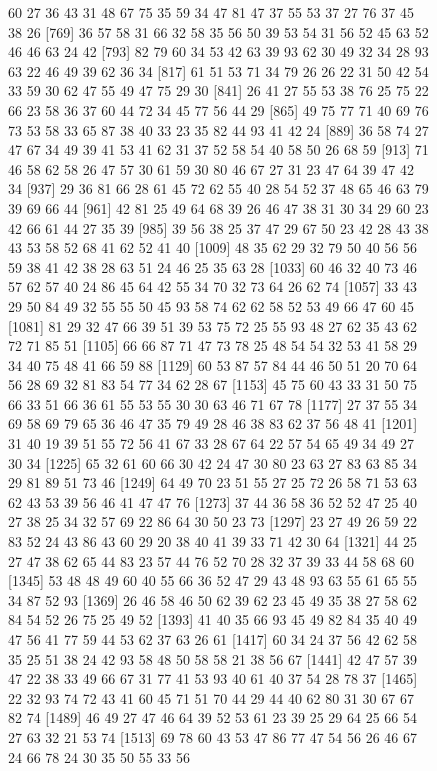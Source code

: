 \documentclass{article}
\begin{document}
\begin{figure}[H]
\begin{Schunk}
\begin{Soutput}
  [745] 60 27 36 43 31 48 67 75 35 59 34 47 81 47 37 55 53 37 27 76 37 45 38 26
  [769] 36 57 58 31 66 32 58 35 56 50 39 53 54 31 56 52 45 63 52 46 46 63 24 42
  [793] 82 79 60 34 53 42 63 39 93 62 30 49 32 34 28 93 63 22 46 49 39 62 36 34
  [817] 61 51 53 71 34 79 26 26 22 31 50 42 54 33 59 30 62 47 55 49 47 75 29 30
  [841] 26 41 27 55 53 38 76 25 75 22 66 23 58 36 37 60 44 72 34 45 77 56 44 29
  [865] 49 75 77 71 40 69 76 73 53 58 33 65 87 38 40 33 23 35 82 44 93 41 42 24
  [889] 36 58 74 27 47 67 34 49 39 41 53 41 62 31 37 52 58 54 40 58 50 26 68 59
  [913] 71 46 58 62 58 26 47 57 30 61 59 30 80 46 67 27 31 23 47 64 39 47 42 34
  [937] 29 36 81 66 28 61 45 72 62 55 40 28 54 52 37 48 65 46 63 79 39 69 66 44
  [961] 42 81 25 49 64 68 39 26 46 47 38 31 30 34 29 60 23 42 66 61 44 27 35 39
  [985] 39 56 38 25 37 47 29 67 50 23 42 28 43 38 43 53 58 52 68 41 62 52 41 40
 [1009] 48 35 62 29 32 79 50 40 56 56 59 38 41 42 38 28 63 51 24 46 25 35 63 28
 [1033] 60 46 32 40 73 46 57 62 57 40 24 86 45 64 42 55 34 70 32 73 64 26 62 74
 [1057] 33 43 29 50 84 49 32 55 55 50 45 93 58 74 62 62 58 52 53 49 66 47 60 45
 [1081] 81 29 32 47 66 39 51 39 53 75 72 25 55 93 48 27 62 35 43 62 72 71 85 51
 [1105] 66 66 87 71 47 73 78 25 48 54 54 32 53 41 58 29 34 40 75 48 41 66 59 88
 [1129] 60 53 87 57 84 44 46 50 51 20 70 64 56 28 69 32 81 83 54 77 34 62 28 67
 [1153] 45 75 60 43 33 31 50 75 66 33 51 66 36 61 55 53 55 30 30 63 46 71 67 78
 [1177] 27 37 55 34 69 58 69 79 65 36 46 47 35 79 49 28 46 38 83 62 37 56 48 41
 [1201] 31 40 19 39 51 55 72 56 41 67 33 28 67 64 22 57 54 65 49 34 49 27 30 34
 [1225] 65 32 61 60 66 30 42 24 47 30 80 23 63 27 83 63 85 34 29 81 89 51 73 46
 [1249] 64 49 70 23 51 55 27 25 72 26 58 71 53 63 62 43 53 39 56 46 41 47 47 76
 [1273] 37 44 36 58 36 52 52 47 25 40 27 38 25 34 32 57 69 22 86 64 30 50 23 73
 [1297] 23 27 49 26 59 22 83 52 24 43 86 43 60 29 20 38 40 41 39 33 71 42 30 64
 [1321] 44 25 27 47 38 62 65 44 83 23 57 44 76 52 70 28 32 37 39 33 44 58 68 60
 [1345] 53 48 48 49 60 40 55 66 36 52 47 29 43 48 93 63 55 61 65 55 34 87 52 93
 [1369] 26 46 58 46 50 62 39 62 23 45 49 35 38 27 58 62 84 54 52 26 75 25 49 52
 [1393] 41 40 35 66 93 45 49 82 84 35 40 49 47 56 41 77 59 44 53 62 37 63 26 61
 [1417] 60 34 24 37 56 42 62 58 35 25 51 38 24 42 93 58 48 50 58 58 21 38 56 67
 [1441] 42 47 57 39 47 22 38 33 49 66 67 31 77 41 53 93 40 61 40 37 54 28 78 37
 [1465] 22 32 93 74 72 43 41 60 45 71 51 70 44 29 44 40 62 80 31 30 67 67 82 74
 [1489] 46 49 27 47 46 64 39 52 53 61 23 39 25 29 64 25 66 54 27 63 32 21 53 74
 [1513] 69 78 60 43 53 47 86 77 47 54 56 26 46 67 24 66 78 24 30 35 50 55 33 56

\end{Soutput}
\end{Schunk}
\end{figure}
\end{document}
